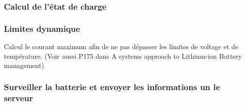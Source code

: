 		\subsubsection{Calcul de l'état de charge}
		
		\subsubsection{Limites dynamique}
		Calcul le courant maximum afin de ne pas dépasser les limites de voltage et de température. (Voir aussi P175 dans A systems approach to Lithium-ion Battery management)
		
		\subsubsection{Surveiller la batterie et envoyer les informations un le serveur}
		
		